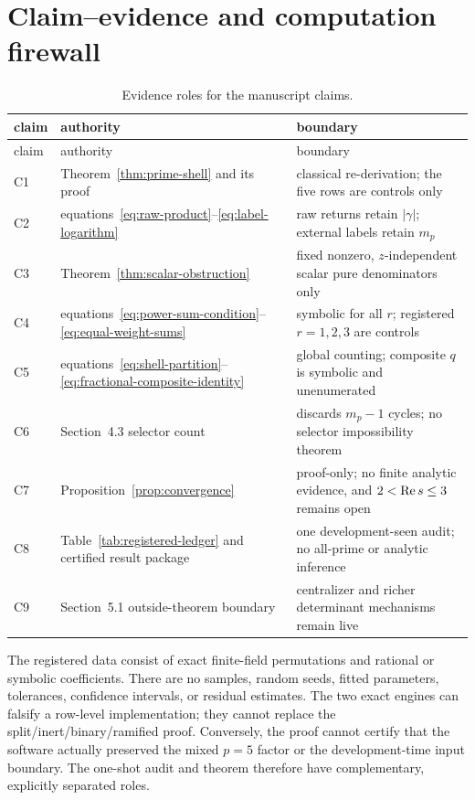 \documentclass[11pt]{article}
\theoremstyle{definition}
\theoremstyle{remark}
\begin{document}
\section{Claim--evidence and computation firewall}
\label{app:firewall}

\begingroup
\small
\begin{longtable}{C{0.08\textwidth} p{0.38\textwidth} p{0.43\textwidth}}
\caption{Evidence roles for the manuscript claims.}
\label{tab:evidence-roles}\\
\toprule
claim & authority & boundary \\
\midrule
\endfirsthead
\toprule
claim & authority & boundary \\
\midrule
\endhead
C1 & Theorem~\ref{thm:prime-shell} and its proof & classical re-derivation;
the five rows are controls only \\
C2 & equations~\eqref{eq:raw-product}--\eqref{eq:label-logarithm} & raw
returns retain \(|\gamma|\); external labels retain \(m_p\) \\
C3 & Theorem~\ref{thm:scalar-obstruction} & fixed nonzero,
\(z\)-independent scalar pure denominators only \\
C4 & equations~\eqref{eq:power-sum-condition}--\eqref{eq:equal-weight-sums}
& symbolic for all \(r\); registered \(r=1,2,3\) are controls \\
C5 & equations~\eqref{eq:shell-partition}--
\eqref{eq:fractional-composite-identity} & global counting; composite \(q\)
is symbolic and unenumerated \\
C6 & Section~4.3 selector count & discards \(m_p-1\) cycles; no selector
impossibility theorem \\
C7 & Proposition~\ref{prop:convergence} & proof-only; no finite analytic
evidence, and \(2<\operatorname{Re} s\le3\) remains open \\
C8 & Table~\ref{tab:registered-ledger} and certified result package & one
development-seen audit; no all-prime or analytic inference \\
C9 & Section~5.1 outside-theorem boundary & centralizer and richer
determinant mechanisms remain live \\
\bottomrule
\end{longtable}
\endgroup

The registered data consist of exact finite-field permutations and rational
or symbolic coefficients.  There are no samples, random seeds, fitted
parameters, tolerances, confidence intervals, or residual estimates.  The
two exact engines can falsify a row-level implementation; they cannot replace
the split/inert/binary/ramified proof.  Conversely, the proof cannot certify
that the software actually preserved the mixed \(p=5\) factor or the
development-time input boundary.  The one-shot audit and theorem therefore
have complementary, explicitly separated roles.
\end{document}
